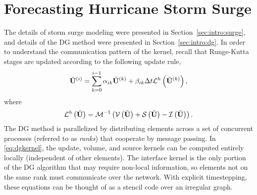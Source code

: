 \section{Forecasting Hurricane Storm Surge}
\label{sec:dgswem}

The details of storm surge modeling were presented in Section~\ref{sec:intro:surge}, and details of the DG method were presented in Section~\ref{sec:intro:dg}. 
In order to understand the communication pattern of the kernel, recall that Runge-Kutta stages are updated according to the following update rule,
\begin{equation*}
\tilde{{\bf U}}^{(i)} = \sum_{k=0}^{i-1} \alpha_{ik} \tilde{{\bf U}}^{(k)} + \beta_{ik} \Delta t \mathcal{L}^h\left(\tilde{{\bf U}}^{(k)}\right),
\end{equation*}
where
\begin{equation}
\mathcal{L}^h \left(\tilde{{\bf U}} \right) = \mathcal{M}^{-1}\left( \mathcal{V}\left(\tilde{{\bf U}}\right) + \mathcal{S}\left(\tilde{{\bf U}}\right) - \mathcal{I}\left(\tilde{{\bf U}}\right) \right).
\label{eq:dgkernel}
\end{equation}
The DG method is parallelized by distributing elements across a set of concurrent processes (referred to as {\em ranks}) that cooperate by message passing.
In \eqref{eq:dgkernel}, the update, volume, and source kernels can be computed entirely locally (independent of other elements).
The interface kernel is the only portion of the DG algorithm that may require non-local information, so elements not on the same rank must communicate over the network.
With explicit timestepping, these equations can be thought of as a stencil code over an irregular graph.



